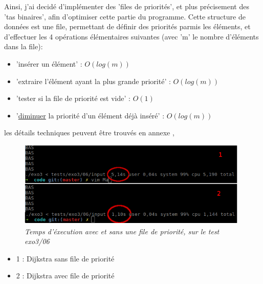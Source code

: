 \documentclass[10pt]{article}
\begin{document}
				Ainsi, j'ai decidé d'implémenter des 'files de priorités', et plus précisement des 'tas binaires', afin
				d'optimiser cette partie du programme.
				Cette structure de données est une file, permettant de définir des priorités parmis les éléments,
				et d'effectuer les 4 opérations élémentaires suivantes (avec 'm' le nombre d'éléments dans la file):
				\begin{itemize}[label=-]
					\item 'insérer un élément' : \(O(log(m))\)
					\item 'extraire l'élément ayant la plus grande priorité' : \({O(log(m))}\)
					\item 'tester si la file de priorité est vide' : \(O(1)\)
					\item '\underline{diminuer} la priorité d'un élément déjà inséré' : \(O(log(m))\)
				\end{itemize}
				les détails techniques peuvent être trouvés en annexe \cite{binary_heap},
				
				\begin{figure}[H]
					\begin{center}
						\includegraphics[width=11cm,height=\textheight,keepaspectratio]{./images/performances.png}
					\end{center}
					\caption{\textit{Temps d'éxecution avec et sans une file de priorité, sur le test exo3/06}}
				\end{figure}
								
				\begin{itemize}[label=-]
					\setlength\itemsep{0.1em}
					\item 1 : Dijkstra sans file de priorité
					\item 2 : Dijkstra avec file de priorité
				\end{itemize}
\end{document}
